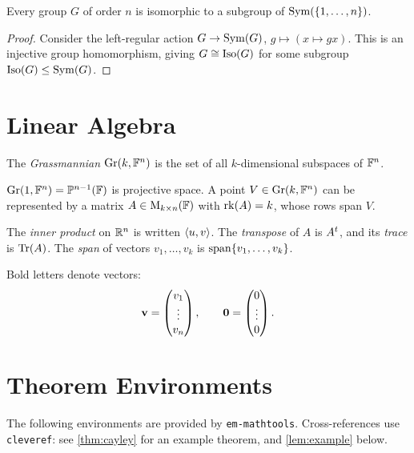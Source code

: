 \documentclass[12pt]{article}
\begin{document}
\begin{theorem}[Cayley]
    \label{thm:cayley}
    Every group $G$ of order $n$ is isomorphic to a subgroup of $\mathrm{Sym}(\{1,\ldots,n\})$.
\end{theorem}

\begin{proof}
    Consider the left-regular action $G \to \mathrm{Sym}(G)$, $g \mapsto (x \mapsto gx)$.
    This is an injective group homomorphism, giving $G \cong \mathrm{Iso}(G)$ for some
    subgroup $\mathrm{Iso}(G) \leq \mathrm{Sym}(G)$.
\end{proof}

\section{Linear Algebra}

\begin{definition}
    The \emph{Grassmannian} $\mathrm{Gr}(k, \mathbb{F}^{n})$ is the set of all $k$-dimensional
    subspaces of $\mathbb{F}^{n}$.
\end{definition}

\begin{example}
    $\mathrm{Gr}(1, \mathbb{F}^{n}) = \mathbb{P}^{n-1}(\mathbb{F})$ is projective space.
    A point $V \in \mathrm{Gr}(k, \mathbb{F}^{n})$ can be represented by a matrix
    $A \in \mathrm{M}_{k \times n}(\mathbb{F})$ with $\mathrm{rk}(A) = k$, whose rows span $V$.
\end{example}

The \emph{inner product} on $\mathbb{R}^{n}$ is written $\langle{u}, {v}\rangle$.
The \emph{transpose} of $A$ is ${A}^{t}$, and its \emph{trace} is $\mathrm{Tr}(A)$.
The \emph{span} of vectors $v_{1}, \ldots, v_{k}$ is $\mathrm{span}\{v_{1}, \ldots, v_{k}\}$.

Bold letters denote vectors:
\[
    \mathbf{v} = \begin{pmatrix} v_{1} \\ \vdots \\ v_{n} \end{pmatrix}, \qquad
    \mathbf{0} = \begin{pmatrix} 0 \\ \vdots \\ 0 \end{pmatrix}.
\]

\section{Theorem Environments}

The following environments are provided by \texttt{em-mathtools}.
Cross-references use \texttt{cleveref}: see \cref{thm:cayley} for an example theorem,
and \cref{lem:example} below.
\end{document}
